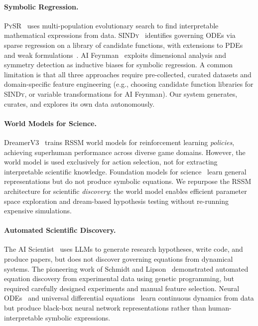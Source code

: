 \documentclass{article}
\newcommand{\pysr}{\textsc{PySR}}
\newcommand{\sindy}{\textsc{SINDy}}
\begin{document}
\paragraph{Symbolic Regression.}
\pysr{}~\cite{cranmer2023pysr} uses multi-population evolutionary search
to find interpretable mathematical expressions from data.
\sindy{}~\cite{brunton2016sindy} identifies governing ODEs via sparse
regression on a library of candidate functions, with extensions to
PDEs~\cite{rudy2017pdefind} and weak formulations~\cite{messenger2021weak}.
AI Feynman~\cite{udrescu2020ai} exploits dimensional analysis and symmetry
detection as inductive biases for symbolic regression.
A common limitation is that all three approaches require pre-collected,
curated datasets and domain-specific feature engineering (e.g., choosing
candidate function libraries for \sindy{}, or variable transformations
for AI Feynman). Our system generates, curates, and explores its own
data autonomously.

\paragraph{World Models for Science.}
DreamerV3~\cite{hafner2023dreamerv3} trains RSSM world models for
reinforcement learning \emph{policies}, achieving superhuman performance
across diverse game domains. However, the world model is used exclusively
for action selection, not for extracting interpretable scientific
knowledge. Foundation models for science~\cite{bommasani2022foundation}
learn general representations but do not produce symbolic equations.
We repurpose the RSSM architecture for scientific \emph{discovery}:
the world model enables efficient parameter space exploration and
dream-based hypothesis testing without re-running expensive simulations.

\paragraph{Automated Scientific Discovery.}
The AI Scientist~\cite{lu2024darwin} uses LLMs to generate research
hypotheses, write code, and produce papers, but does not discover
governing equations from dynamical systems. The pioneering work of
Schmidt and Lipson~\cite{schmidt2009distilling} demonstrated automated
equation discovery from experimental data using genetic programming,
but required carefully designed experiments and manual feature selection.
Neural ODEs~\cite{chen2018neuralode} and universal differential
equations~\cite{rackauckas2021ude} learn continuous dynamics from data
but produce black-box neural network representations rather than
human-interpretable symbolic expressions.
\end{document}

